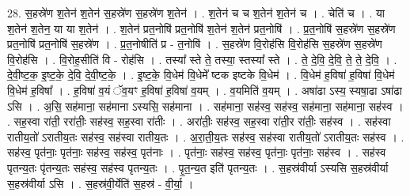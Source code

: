 \documentclass[17pt]{extarticle}
\begin{document}
28. स॒हस्रे॑ण श॒तेन॑ श॒तेन॑ स॒हस्रे॑ण स॒हस्रे॑ण श॒तेन॑ । . श॒तेन॑ च च श॒तेन॑ श॒तेन॑ च । . चेति॑ च । . या श॒तेन॑ श॒तेन॒ या या श॒तेन॑ । . श॒तेन॑ प्रत॒नोषि॑ प्रत॒नोषि॑ श॒तेन॑ श॒तेन॑ प्रत॒नोषि॑ । . प्र॒त॒नोषि॑ स॒हस्रे॑ण स॒हस्रे॑ण प्रत॒नोषि॑ प्रत॒नोषि॑ स॒हस्रे॑ण । . प्र॒त॒नोषीति॑ प्र - त॒नोषि॑ । . स॒हस्रे॑ण वि॒रोह॑सि वि॒रोह॑सि स॒हस्रे॑ण स॒हस्रे॑ण वि॒रोह॑सि । . वि॒रोह॒सीति॑ वि - रोह॑सि । . तस्या᳚ स्ते ते॒ तस्या॒ स्तस्या᳚ स्ते । . ते॒ दे॒वि॒ दे॒वि॒ ते॒ ते॒ दे॒वि॒ । . दे॒वी॒ष्ट॒क॒ इ॒ष्ट॒के॒ दे॒वि॒ दे॒वी॒ष्ट॒के॒ । . इ॒ष्ट॒के॒ वि॒धेम॑ वि॒धेमे᳚ ष्टक इष्टके वि॒धेम॑ । . वि॒धेम॑ ह॒विषा॑ ह॒विषा॑ वि॒धेम॑ वि॒धेम॑ ह॒विषा᳚ । . ह॒विषा॑ व॒यं ॅव॒यꣳ ह॒विषा॑ ह॒विषा॑ व॒यम् । . व॒यमिति॑ व॒यम् । . अषा॑ढा ऽस्य॒ स्यषा॒ढा ऽषा॑ढा ऽसि । . अ॒सि॒ सह॑माना॒ सह॑माना ऽस्यसि॒ सह॑माना । . सह॑माना॒ सह॑स्व॒ सह॑स्व॒ सह॑माना॒ सह॑माना॒ सह॑स्व । . सह॒स्वा रा॑ती॒ ररा॑तीः॒ सह॑स्व॒ सह॒स्वा रा॑तीः । . अरा॑तीः॒ सह॑स्व॒ सह॒स्वा रा॑ती॒र रा॑तीः॒ सह॑स्व । . सह॑स्वा रातीय॒तो॑ ऽरातीय॒तः सह॑स्व॒ सह॑स्वा रातीय॒तः । . अ॒रा॒ती॒य॒तः सह॑स्व॒ सह॑स्वा रातीय॒तो॑ ऽरातीय॒तः सह॑स्व । . सह॑स्व॒ पृत॑नाः॒ पृत॑नाः॒ सह॑स्व॒ सह॑स्व॒ पृत॑नाः । . पृत॑नाः॒ सह॑स्व॒ सह॑स्व॒ पृत॑नाः॒ पृत॑नाः॒ सह॑स्व । . सह॑स्व पृतन्य॒तः पृ॑तन्य॒तः सह॑स्व॒ सह॑स्व पृतन्य॒तः । . पृ॒त॒न्य॒त इति॑ पृतन्य॒तः । . स॒हस्र॑वीर्या ऽस्यसि स॒हस्र॑वीर्या स॒हस्र॑वीर्या ऽसि । . स॒हस्र॑वी॒र्येति॑ स॒हस्र॑ - वी॒र्या॒ । \newline
\end{document}
